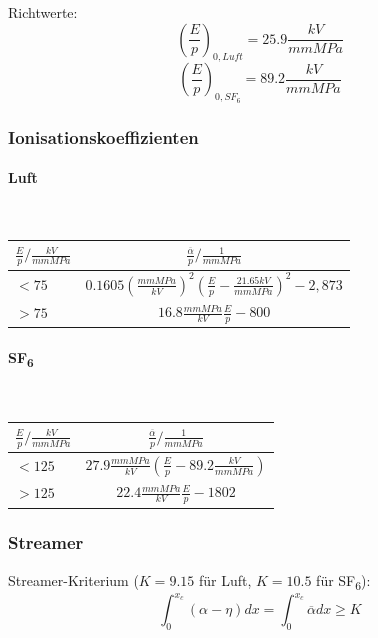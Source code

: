 \documentclass[9pt,a4paper]{scrartcl}
\begin{document}
\begin{multicols}{3}
		Richtwerte: \\
		\[\left( \frac{E}{p}\right)_{0,Luft} = 25.9 \frac{kV}{mm MPa}\]
		\[\left( \frac{E}{p}\right)_{0,SF_6} = 89.2 \frac{kV}{mm MPa}\]
		
		\subsubsection{Ionisationskoeffizienten}
		\paragraph{Luft} \hfill \\
		\begin{tabular}{l|c}
		$\frac{E}{p} / \frac{kV}{mm MPa}$ & $\frac{\overline \alpha}{p} / \frac{1}{mm MPa}$ \\ \hline
		$< 75$ & $0.1605 \left( \frac{mm MPa}{kV} \right)^2 \left(\frac{E}{p} - \frac{21.65 kV}{mm MPa} \right)^2 - 2,873 $ \\
		$> 75$ & $16.8 \frac{mm MPa}{kV} \frac{E}{p} - 800$
		\end{tabular}
		\paragraph{SF\textsubscript{6}} \hfill \\
		\begin{tabular}{l|c}
		$\frac{E}{p} / \frac{kV}{mm MPa}$ & $\frac{\overline \alpha}{p} / \frac{1}{mm MPa}$ \\ \hline
		$< 125$ & $27.9 \frac{mm MPa}{kV} \left( \frac{E}{p} - 89.2 \frac{kV}{mm MPa} \right)$ \\
		$> 125$ & $22.4 \frac{mm MPa}{kV} \frac{E}{p} -1802$
		\end{tabular}
		
		\subsubsection{Streamer}
		Streamer-Kriterium ($K = 9.15$ für Luft, $K = 10.5$ für SF\textsubscript{6}):
		\[\int_0^{x_c} (\alpha - \eta) dx = \int_0^{x_c} \overline \alpha dx \ge K\]


\end{multicols}
\end{document}

